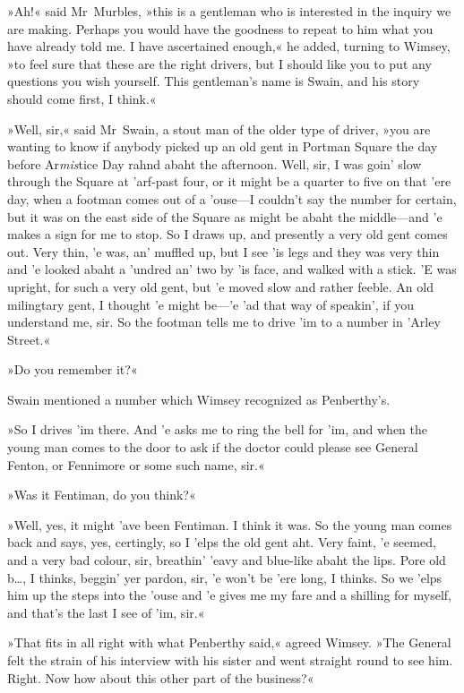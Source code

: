 »Ah!« said Mr~Murbles, »this is a gentleman who is interested in the inquiry we are making. Perhaps you would have the goodness to repeat to him what you have already told me. I have ascertained enough,« he added, turning to Wimsey, »to feel sure that these are the right drivers, but I should like you to put any questions you wish yourself. This gentleman's name is Swain, and his story should come first, I think.«

»Well, sir,« said Mr~Swain, a stout man of the older type of driver, »you are wanting to know if anybody picked up an old gent in Portman Square the day before Ar\textit{mis}tice Day rahnd abaht the afternoon. Well, sir, I was goin' slow through the Square at 'arf-past four, or it might be a quarter to five on that 'ere day, when a footman comes out of a 'ouse—I couldn't say the number for certain, but it was on the east side of the Square as might be abaht the middle—and 'e makes a sign for me to stop. So I draws up, and presently a very old gent comes out. Very thin, 'e was, an' muffled up, but I see 'is legs and they was very thin and 'e looked abaht a 'undred an' two by 'is face, and walked with a stick. 'E was upright, for such a very old gent, but 'e moved slow and rather feeble. An old milingtary gent, I thought 'e might be—'e 'ad that way of speakin', if you understand me, sir. So the footman tells me to drive 'im to a number in 'Arley Street.«

»Do you remember it?«

Swain mentioned a number which Wimsey recognized as Penberthy's.

»So I drives 'im there. And 'e asks me to ring the bell for 'im, and when the young man comes to the door to ask if the doctor could please see General Fenton, or Fennimore or some such name, sir.«

»Was it Fentiman, do you think?«

»Well, yes, it might 'ave been Fentiman. I think it was. So the young man comes back and says, yes, certingly, so I 'elps the old gent aht. Very faint, 'e seemed, and a very bad colour, sir, breathin' 'eavy and blue-like abaht the lips. Pore old b\dots, I thinks, beggin' yer pardon, sir, 'e won't be 'ere long, I thinks. So we 'elps him up the steps into the 'ouse and 'e gives me my fare and a shilling for myself, and that's the last I see of 'im, sir.«

»That fits in all right with what Penberthy said,« agreed Wimsey. »The General felt the strain of his interview with his sister and went straight round to see him. Right. Now how about this other part of the business?«

